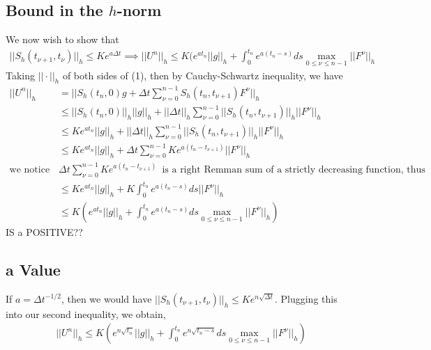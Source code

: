 \subsection{Bound in the $h$-norm}
We now wish to show that 
\begin{align*} 
||S_h(t_{\nu+1},t_{\nu})||_h \leq Ke^{a \Delta t} \implies ||U^n||_h \leq K(e^{at_n} ||g||_h + \int_0^{t_n} e^{a(t_n-s)} ds \max_{0\leq \nu \leq n-1} ||F^{\nu}||_h
\end{align*}
Taking $||\cdot ||_h$ of both sides of (1), then by Cauchy-Schwartz inequality, we have
\begin{align*}
||U^n||_h &= ||S_h(t_n,0)g+\Delta t \sum_{\nu = 0}^{n-1} S_h(t_n , t_{\nu + 1}) F^{\nu} ||_h \\
&\leq ||S_h(t_n,0)||_h||g||_h+||\Delta t||_h \sum_{\nu = 0}^{n-1} ||S_h(t_n , t_{\nu + 1})||_h || F^{\nu} ||_h \\
&\leq Ke^{at_n}||g||_h+||\Delta t||_h \sum_{\nu = 0}^{n-1} ||S_h(t_n , t_{\nu + 1})||_h || F^{\nu} ||_h\\
&\leq Ke^{at_n}||g||_h+\Delta t \sum_{\nu = 0}^{n-1} Ke^{a(t_n - t_{\nu+1})} || F^{\nu} ||_h\\ 
\text{we notice that} \enspace & \Delta t \sum_{\nu = 0}^{n-1} Ke^{a(t_n - t_{\nu+1})} \enspace \text{is a right Remman sum of a strictly decreasing function, thus} \\
&\leq Ke^{at_n}||g||_h+ K\int_0^{t_n} e^{a(t_n - s)} ds || F^{\nu} ||_h\\ 
&\leq K(e^{at_n}||g||_h+ \int_0^{t_n} e^{a(t_n - s)} ds \max_{0\leq \nu \leq n-1} ||F^{\nu}||_h)
\end{align*}
IS a POSITIVE??
\subsection{a Value}
If $a = \Delta t^{-1/2}$, then we would have $||S_h(t_{\nu + 1}, t_{\nu})||_h \leq Ke^{n\sqrt{\Delta t}}$. Plugging this into our second inequality, we obtain, 
\begin{align*}
||U^n||_h\leq K(e^{n\sqrt{t_n}}||g||_h+ \int_0^{t_n} e^{n\sqrt{t_n - s}} ds \max_{0\leq \nu \leq n-1} ||F^{\nu}||_h)
\end{align*}
